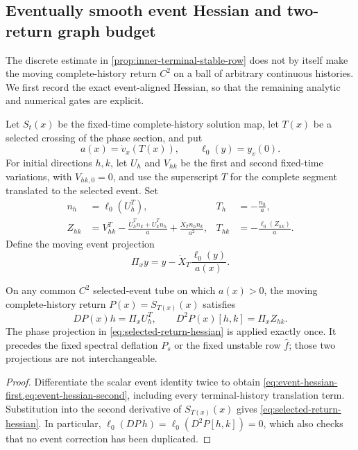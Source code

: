 \subsection{Eventually smooth event Hessian and two-return graph budget}

The discrete estimate in \cref{prop:inner-terminal-stable-row} does not by
itself make the moving complete-history return \(C^2\) on a ball of arbitrary
continuous histories.  We first record the exact event-aligned Hessian, so
that the remaining analytic and numerical gates are explicit.

Let \(S_t(x)\) be the fixed-time complete-history solution map, let \(T(x)\)
be a selected crossing of the phase section, and put
\[
 a(x)=\dot v_x(T(x)),\qquad \ell_0(y)=y_v(0).
\]
For initial directions \(h,k\), let \(U_h\) and \(V_{hk}\) be the first and
second fixed-time variations, with \(V_{hk,0}=0\), and use the superscript
\(T\) for the complete segment translated to the selected event.  Set
\begin{align}
 n_h&=\ell_0(U_h^T),&
 T_h&=-\frac{n_h}{a},                                      \label{eq:event-hessian-first}\\
 Z_{hk}&=V_{hk}^T-
 \frac{\dot U_h^Tn_k+\dot U_k^Tn_h}{a}
 +\frac{\ddot X_Tn_hn_k}{a^2},&
 T_{hk}&=-\frac{\ell_0(Z_{hk})}{a}.                       \label{eq:event-hessian-second}
\end{align}
Define the moving event projection
\begin{equation}
 \Pi_x y=y-\dot X_T\frac{\ell_0(y)}{a(x)}.                 \label{eq:moving-event-projection}
\end{equation}

\begin{proposition}
\label{prop:selected-return-hessian}
On any common \(C^2\) selected-event tube on which \(a(x)>0\), the moving
complete-history return \(P(x)=S_{T(x)}(x)\) satisfies
\begin{equation}
 DP(x)h=\Pi_xU_h^T,\qquad
 D^2P(x)[h,k]=\Pi_xZ_{hk}.                              \label{eq:selected-return-hessian}
\end{equation}
The phase projection in \cref{eq:selected-return-hessian} is applied exactly
once.  It precedes the fixed spectral deflation \(P_s\) or the fixed
unstable row \(\widehat f\); those two projections are not interchangeable.
\end{proposition}

\begin{proof}
Differentiate the scalar event identity twice to obtain
\cref{eq:event-hessian-first,eq:event-hessian-second}, including every
terminal-history translation term.  Substitution into the second derivative
of \(S_{T(x)}(x)\) gives \cref{eq:selected-return-hessian}.  In particular,
\(\ell_0(DP\,h)=\ell_0(D^2P[h,k])=0\), which also checks that no event
correction has been duplicated.
\end{proof}

